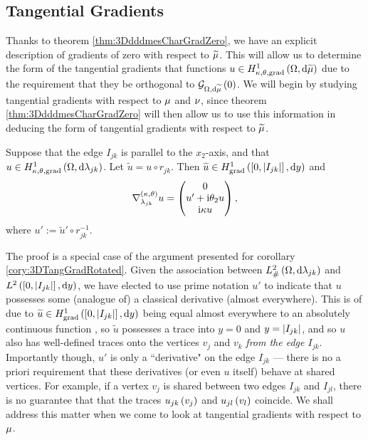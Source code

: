 \subsection{Tangential Gradients} \label{ssec:3DTangGradients}
Thanks to theorem \ref{thm:3DdddmesCharGradZero}, we have an explicit description of gradients of zero with respect to $\widetilde{\mu}$.
This will allow us to determine the form of the tangential gradients that functions $u\in H^1_{\kappa,\theta,\mathrm{grad}}\left( \Omega, \mathrm{d}\widetilde{\mu} \right)$ due to the requirement that they be orthogonal to $\mathcal{G}_{ \Omega, \mathrm{d}\widetilde{\mu}}\left( 0 \right)$.
We will begin by studying tangential gradients with respect to $\mu$ and $\nu$, since theorem \ref{thm:3DdddmesCharGradZero} will then allow us to use this information in deducing the form of tangential gradients with respect to $\widetilde{\mu}$.
\begin{prop} \label{prop:3DTangGradParallel}
	\sloppy Suppose that the edge $I_{jk}$ is parallel to the $x_2$-axis, and that $u\in H^1_{\kappa,\theta,\mathrm{grad}}\left( \Omega, \mathrm{d}\lambda_{jk} \right)$.
	Let $\widetilde{u} = u\circ r_{jk}$.
	Then $\widetilde{u}\in H^1_\mathrm{grad}\left( \left[ 0,\left\lvert I_{jk} \right\rvert \right], \mathrm{d}y \right)$ and
	\begin{align*}
		\nabla^{\left( \kappa, \theta \right)}_{\lambda_{jk}}u = 
		\begin{pmatrix}
			0 \\ u' + \mathrm{i}\theta_2 u \\ \mathrm{i}\kappa u
		\end{pmatrix},
	\end{align*}
	where $u' := \widetilde{u}'\circ r_{jk}^{-1}$.
\end{prop}
The proof is a special case of the argument presented for corollary \ref{cory:3DTangGradRotated}.
Given the association between $L^2_{\#}\left( \Omega,\mathrm{d} \lambda_{jk} \right)$ and $L^{2}\left( \left[ 0,\left\lvert I_{jk} \right\rvert \right],\mathrm{d} y \right)$, we have elected to use prime notation $u'$ to indicate that $u$ possesses some (analogue of) a classical derivative (almost everywhere).
This is of due to $\widetilde{u}\in H^1_\mathrm{grad}\left( \left[ 0,\left\lvert I_{jk} \right\rvert \right], \mathrm{d}y \right)$ being equal almost everywhere to an absolutely continuous function \cite[chapter 5, page 259]{evans2010partial}, so $\widetilde{u}$ possesses a trace into $y=0$ and $y=\left\lvert I_{jk} \right\rvert$, and so $u$ also has well-defined traces onto the vertices $v_j$ and $v_k$ \emph{from the edge $I_{jk}$}.
Importantly though, $u'$ is only a ``derivative" on the edge $I_{jk}$ --- there is no a priori requirement that these derivatives (or even $u$ itself) behave at shared vertices.
For example, if a vertex $v_j$ is shared between two edges $I_{jk}$ and $I_{jl}$, there is no guarantee that that the traces $u_{jk}\left( v_j \right)$ and $u_{jl}\left( v_l \right)$ coincide. 
We shall address this matter when we come to look at tangential gradients with respect to $\mu$.

